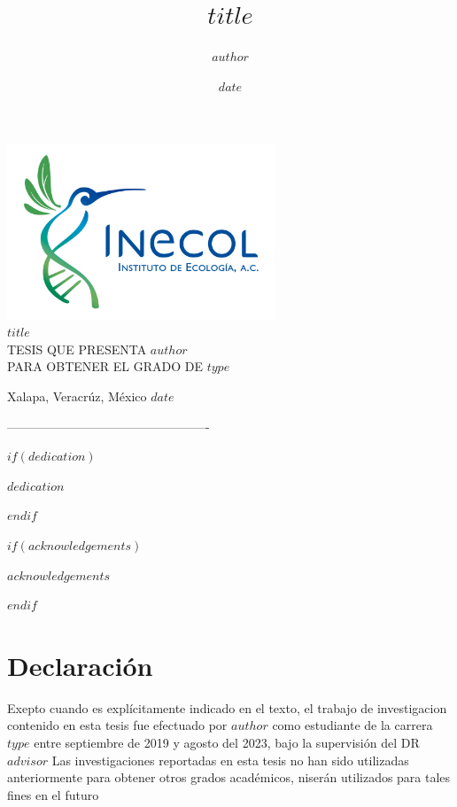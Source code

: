 \documentclass[12pt,twoside]{reedthesis}
\title{$title$}
\author{$author$}
\date{$date$}
\begin{document}

\frontmatter %
\pagestyle{empty} %

\begin{flushleft}
  
  \medskip
  \medskip
  \includegraphics[width=0.60\textwidth]{Inecol.jpeg}\\\vspace {3.cm} 
  {\Large{\bf $title$}}\\\vspace{3.cm} 
  TESIS QUE PRESENTA \textit{\textbf{$author$}}\\
  PARA OBTENER EL GRADO DE \textit{\textbf{$type$}}\\\vspace{2.cm} 
  \medskip
  \medskip
  
  Xalapa, Veracrúz, México $date$
  
-------------------------------------------------  
\end{flushleft}


$if(dedication)$
  \begin{dedication}
    $dedication$
  \end{dedication}
$endif$

$if(acknowledgements)$
  \begin{acknowledgements}
    $acknowledgements$
  \end{acknowledgements}
$endif$
\newpage
\thispagestyle{empty}
\hypertarget{declaration-of-authorship}{%
\section*{Declaración}\label{declaration-of-authorship}}

Exepto cuando es explícitamente indicado en el texto, el trabajo de investigacion contenido en esta tesis fue efectuado por $author$ como estudiante de la carrera $type$ entre septiembre de 2019 y agosto del 2023, bajo la supervisión del DR $advisor$
\vspace{1cm}
Las investigaciones reportadas en esta tesis no han sido utilizadas anteriormente para obtener otros grados académicos, niserán utilizados para tales fines en el futuro
\end{document}
